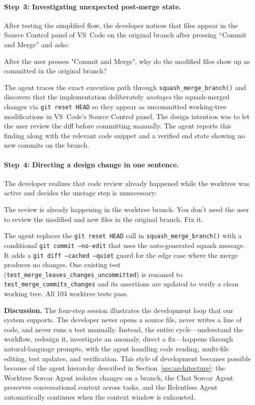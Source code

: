\documentclass{article}
\begin{document}
\paragraph{Step~3: Investigating unexpected post-merge state.} After testing the simplified flow, the developer notices that files appear in the Source Control panel of VS~Code on the original branch after pressing ``Commit and Merge'' and asks:

\begin{prompt}
After the user presses "Commit and Merge", why do the modified files show up as 
committed in the original branch?
\end{prompt}

\noindent The agent traces the exact execution path through \texttt{squash\_merge\_branch()} and discovers that the implementation deliberately \emph{unstages} the squash-merged changes via \texttt{git reset HEAD} so they appear as uncommitted working-tree modifications in VS~Code's Source Control panel.  The design intention was to let the user review the diff before committing manually.  The agent reports this finding along with the relevant code snippet and a verified end state showing no new commits on the branch.

\paragraph{Step~4: Directing a design change in one sentence.} The developer realizes that code review already happened while the worktree was active and decides the unstage step is unnecessary:

\begin{prompt}
The review is already happening in the worktree branch. You don't need the user 
to review the modified and new files in the original branch. Fix it.
\end{prompt}

\noindent The agent replaces the \texttt{git reset HEAD} call in \texttt{squash\_merge\_branch()} with a conditional \texttt{git commit --no-edit} that uses the auto-generated squash message.  It adds a \texttt{git diff --cached --quiet} guard for the edge case where the merge produces no changes.  One existing test (\texttt{test\_merge\_leaves\_changes\_uncommitted}) is renamed to \texttt{test\_merge\_commits\_changes} and its assertions are updated to verify a clean working tree.  All 104 worktree tests pass.

\medskip
\noindent\textbf{Discussion.} The four-step session illustrates the development loop that our system supports.  The developer never opens a source file, never writes a line of code, and never runs a test manually.  Instead, the entire cycle---understand the workflow, redesign it, investigate an anomaly, direct a fix---happens through natural-language prompts, with the agent handling code reading, multi-file editing, test updates, and verification.  This style of development becomes possible because of the agent hierarchy described in Section~\ref{sec:architecture}: the Worktree Sorcar Agent isolates changes on a branch, the Chat Sorcar Agent preserves conversational context across tasks, and the Relentless Agent automatically continues when the context window is exhausted.
\end{document}
